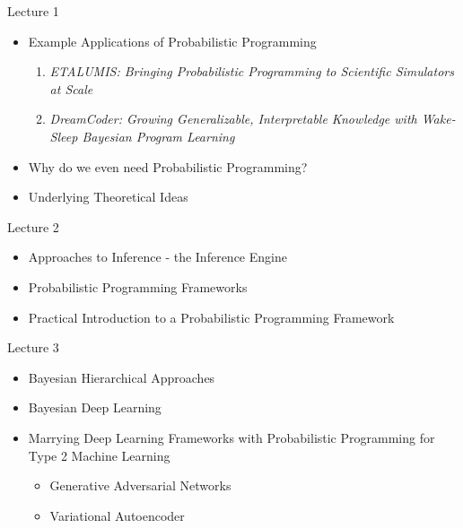 \documentclass[AERbeamer%
              ,optEnglish%
              ,optBiber%
              ,optBibstyleAlphabetic%
              ,optBeamerClassicFormat%
              ]{AERlatex}%
\begin{document}
\begin{frame}[c]{Lecture 1}
    \centering
    \begin{itemize}
        \item Example Applications of Probabilistic Programming
        \begin{enumerate}
            \item \textit{ETALUMIS: Bringing Probabilistic Programming to Scientific Simulators at Scale}
            \item \textit{DreamCoder: Growing Generalizable, Interpretable Knowledge with Wake-Sleep Bayesian Program Learning}
        \end{enumerate}
        \item Why do we even need Probabilistic Programming?
        \item Underlying Theoretical Ideas
    \end{itemize}
\end{frame}


\begin{frame}[c]{Lecture 2}
    \centering
    \begin{itemize}
        \item Approaches to Inference - the Inference Engine
        \item Probabilistic Programming Frameworks
        \item Practical Introduction to a Probabilistic Programming Framework
    \end{itemize}
\end{frame}


\begin{frame}[c]{Lecture 3}
    \centering
    \begin{itemize}
        \item Bayesian Hierarchical Approaches
        \item Bayesian Deep Learning
        \item Marrying Deep Learning Frameworks with Probabilistic Programming for Type 2 Machine Learning
        \begin{itemize}
            \item Generative Adversarial Networks
            \item Variational Autoencoder
        \end{itemize}
    \end{itemize}
\end{frame}
\end{document}
